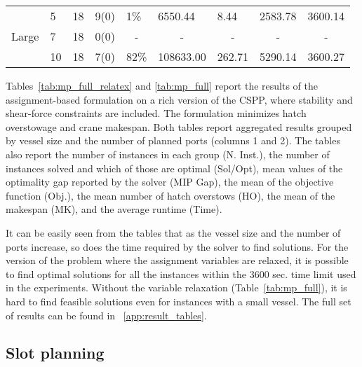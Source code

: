 \documentclass[preprint,12pt,authoryear]{elsarticle}
\begin{document}
\begin{table}[]
\begin{tabular}{llcrlllll}
        \multirow{3}{*}{Large}              & 5                                  & 18                & 9(0)             & 1\%                                  & 6550.44                           & 8.44                            & 2583.78                         & 3600.14                           \\
                                            & 7                                  & 18                & 0(0)             & \multicolumn{1}{c}{-}                & \multicolumn{1}{c}{-}             & \multicolumn{1}{c}{-}           & \multicolumn{1}{c}{-}           & \multicolumn{1}{c}{-}             \\
                                            & 10                                 & 18                & 7(0)             & 82\%                                 & 108633.00                         & 262.71                          & 5290.14                         & 3600.27                           \\ \hline
    \end{tabular}
\end{table}

Tables~\ref{tab:mp_full_relatex} and \ref{tab:mp_full} report the results of the assignment-based formulation on a rich version of the CSPP, where stability and shear-force constraints are included. The formulation minimizes hatch overstowage and crane makespan. Both tables report aggregated results grouped by vessel size and the number of planned ports (columns 1 and 2). The tables also report the number of instances in each group (N. Inst.), the number of instances solved and which of those are optimal (Sol/Opt), mean values of the optimality gap reported by the solver (MIP Gap), the mean of the objective function (Obj.), the mean number of hatch overstows (HO), the mean of the makespan (MK), and the average runtime (Time).

It can be easily seen from the tables that as the vessel size and the number of ports increase, so does the time required by the solver to find solutions. For the version of the problem where the assignment variables are relaxed, it is possible to find optimal solutions for all the instances within the 3600 sec. time limit used in the experiments. Without the variable relaxation (Table~\ref{tab:mp_full}), it is hard to find feasible solutions even for instances with a small vessel. The full set of results can be found in ~\ref{app:result_tables}.

\subsection{Slot planning}\label{sec:solMethods4}
\end{document}
